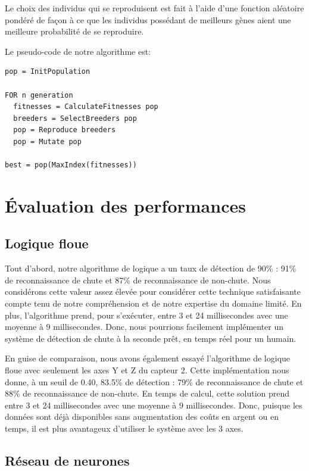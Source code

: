 \documentclass[12pt,letterpaper]{article}
\begin{document}
Le choix des individus qui se reproduisent est fait à l'aide d'une fonction aléatoire pondéré de façon à ce que les individus possédant
de meilleurs gènes aient une meilleure probabilité de se reproduire.

Le pseudo-code de notre algorithme est:

\begin{verbatim}
pop = InitPopulation

FOR n generation
  fitnesses = CalculateFitnesses pop
  breeders = SelectBreeders pop
  pop = Reproduce breeders
  pop = Mutate pop
  
best = pop(MaxIndex(fitnesses))

\end{verbatim}


\section{Évaluation des performances}

\subsection{Logique floue}

Tout d'abord, notre algorithme de logique a un taux de détection de 90\% : 91\% de reconnaissance de chute et 87\% de reconnaissance de non-chute. Nous considérons cette valeur assez élevée pour considérer cette technique satisfaisante compte tenu de notre compréhension et de notre expertise du domaine limité. En plus, l'algorithme prend, pour s'exécuter, entre 3 et 24 millisecondes avec une moyenne à 9 millisecondes. Donc, nous pourrions facilement implémenter un système de détection de chute à la seconde prêt, en temps réel pour un humain.

En guise de comparaison, nous avons également essayé l'algorithme de logique floue avec seulement les axes Y et Z du capteur 2. Cette implémentation nous donne, à un seuil de 0.40, 83.5\% de détection : 79\% de reconnaissance de chute et 88\% de reconnaissance de non-chute. En temps de calcul, cette solution prend entre 3 et 24 millisecondes avec une moyenne à 9 millisecondes. Donc, puisque les données sont déjà disponibles sans augmentation des coûts en argent ou en temps, il est plus avantageux d'utiliser le système avec les 3 axes.

\subsection{Réseau de neurones} %
\end{document}
